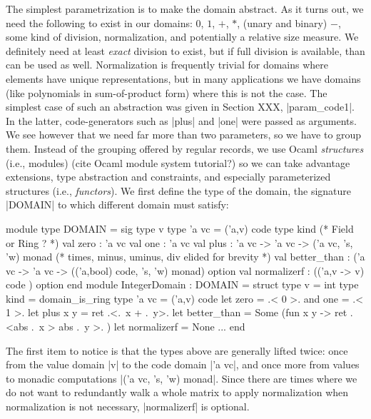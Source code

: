 \documentclass{llncs}
\begin{document}
The simplest parametrization is to make the domain abstract. As it 
turns out, we need the following to exist in our domains:  $0$, $1$,
$+$, $*$, (unary and binary) $-$, some kind of division, normalization,
and potentially a relative size measure.  We definitely need at least
\emph{exact} division to exist, but if full division is available, than
can be used as well.  Normalization is frequently trivial for domains
where elements have unique representations, but in many applications
we have domains (like polynomials in sum-of-product form) where this
is not the case.  The simplest case of such an abstraction was given
in Section XXX, |param_code1|. In the latter, code-generators such as
|plus| and |one| were passed as arguments. We see however that we 
need far more than two parameters, so we have to group them. Instead
of the grouping offered by regular records, we use Ocaml
\emph{structures} (i.e., modules) (cite Ocaml module system tutorial?)
so we can take advantage extensions, type abstraction and constraints,
and especially parameterized structures (i.e., \emph{functors}).
We first define the type of the domain, the signature |DOMAIN| to which
different domain must satisfy:
\begin{figure*}
\begin{code}
module type DOMAIN = sig
  type v    type 'a vc = ('a,v) code
  type kind (* Field or Ring ? *)
  val zero : 'a vc   val one : 'a vc
  val plus : 'a vc -> 'a vc -> ('a vc, 's, 'w) monad
  (* times, minus, uminus, div elided for brevity *)
  val better_than : ('a vc -> 'a vc -> 
      (('a,bool) code, 's, 'w) monad) option
  val normalizerf : (('a,v -> v) code ) option
end 
module IntegerDomain : DOMAIN = struct
  type v = int  type kind = domain_is_ring
  type 'a vc = ('a,v) code
  let zero = .< 0 >.  and one = .< 1 >. 
  let plus x y = ret .<.~x + .~y>. 
  let better_than = Some (fun x y -> ret .<abs .~x > abs .~y >. )
  let normalizerf = None
  ...
end
\end{code}
\end{figure*}
\noindent  The first item to notice is that the types above are
generally lifted twice: once from the value domain |v| to the code
domain |'a vc|, and once more from values to monadic computations
|('a vc, 's, 'w) monad|.  Since there are times where we do not want
to redundantly walk a whole matrix to apply normalization when 
normalization is not necessary, |normalizerf| is optional.
\end{document}

